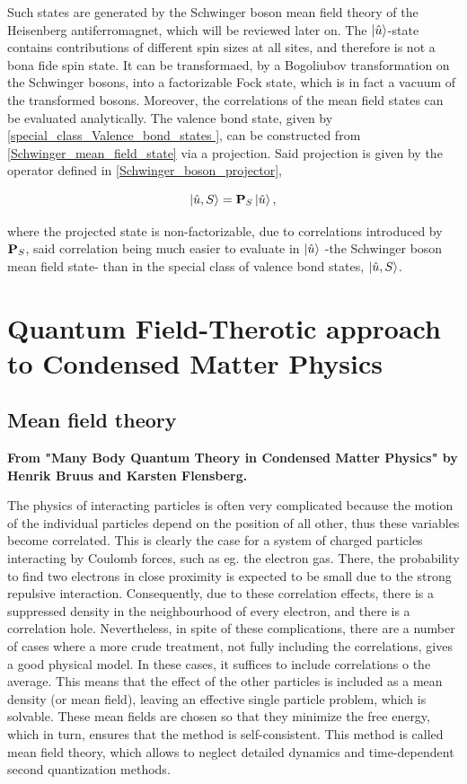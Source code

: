 \documentclass{homework}
\begin{document}
Such states are generated by the Schwinger boson mean field theory of the Heisenberg antiferromagnet, which will be reviewed later on. The $\ket{\hat{u}}$-state contains contributions of different spin sizes at all sites, and therefore is not a bona fide spin state. It can be transformaed, by a Bogoliubov transformation on the Schwinger bosons, into a factorizable Fock state, which is in fact a vacuum of the transformed bosons. Moreover, the correlations of the mean field states can be evaluated analytically. The valence bond state, given by \cref{special_class_Valence_bond_states }, can be constructed from \cref{Schwinger_mean_field_state} via a projection. Said projection is given by the operator defined in \cref{Schwinger_boson_projector},

$$
    \ket{\hat{u}, S} = \mathbf{P}_S \ket{\hat{u}},
$$

where the projected state is non-factorizable, due to correlations introduced by ${\bf P}_S$, said correlation being much easier to evaluate in $\ket{\hat{u}}$ -the Schwinger boson mean field state- than in the special class of valence bond states, $\ket{\hat{u}, S}$.  

\clearpage
\section{Quantum Field-Therotic approach to Condensed Matter Physics}

\subsection{Mean field theory}

\textbf{From "Many Body Quantum Theory in Condensed Matter Physics" by Henrik Bruus and Karsten Flensberg.}

The physics of interacting particles is often very complicated because the motion of the individual particles depend on the position of all other, thus these variables become correlated. This is clearly the case for a system of charged particles interacting by Coulomb forces, such as eg. the electron gas. There, the probability to find two electrons in close proximity is expected to be small due to the strong repulsive interaction. Consequently, due to these correlation effects, there is a suppressed density in the neighbourhood of every electron, and there is a correlation hole. 
Nevertheless, in spite of these complications, there are a number of cases where a more crude treatment, not fully including the correlations, gives a good physical model. In these cases, it suffices to include correlations o the average. This means that the effect of the other particles is included as a mean density (or mean field), leaving an effective single particle problem, which is solvable. These mean fields are chosen so that they minimize the free energy, which in turn, ensures that the method is self-consistent. This method is called mean field theory, which allows to neglect detailed dynamics and time-dependent second quantization methods. \\
\end{document}
